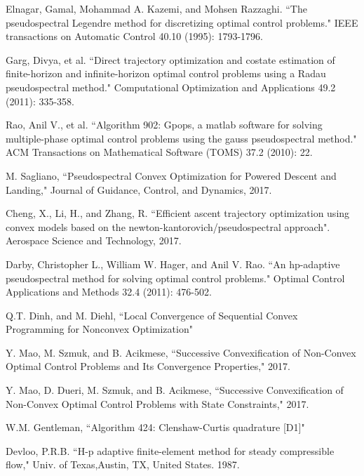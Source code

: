 \documentclass[10pt,a4paper]{article}
\begin{document}
\begin{thebibliography}{1}
		Elnagar, Gamal, Mohammad A. Kazemi, and Mohsen Razzaghi. ``The pseudospectral Legendre method for discretizing optimal control problems." IEEE transactions on Automatic Control 40.10 (1995): 1793-1796.
		
		Garg, Divya, et al. ``Direct trajectory optimization and costate estimation of finite-horizon and infinite-horizon optimal control problems using a Radau pseudospectral method." Computational Optimization and Applications 49.2 (2011): 335-358.
		
		Rao, Anil V., et al. ``Algorithm 902: Gpops, a matlab software for solving multiple-phase optimal control problems using the gauss pseudospectral method." ACM Transactions on Mathematical Software (TOMS) 37.2 (2010): 22.				
					
				
		M. Sagliano, ``Pseudospectral Convex Optimization for Powered Descent and Landing," Journal of Guidance, Control, and Dynamics, 2017.
		
		Cheng, X., Li, H., and Zhang, R. ``Efficient ascent trajectory optimization using convex models based on the newton-kantorovich/pseudospectral approach". Aerospace Science and Technology, 2017.
		
		Darby, Christopher L., William W. Hager, and Anil V. Rao. ``An hp-adaptive pseudospectral method for solving optimal control problems." Optimal Control Applications and Methods 32.4 (2011): 476-502.
		
		Q.T. Dinh, and M. Diehl, ``Local Convergence of Sequential Convex Programming for Nonconvex Optimization"
		
		Y. Mao, M. Szmuk, and B. Acikmese, ``Successive Convexification of Non-Convex Optimal Control Problems and Its Convergence Properties," 2017.
		
		Y. Mao, D. Dueri, M. Szmuk, and B. Acikmese, ``Successive Convexification of Non-Convex Optimal Control Problems with State Constraints," 2017.
		
		W.M. Gentleman, ``Algorithm 424: Clenshaw-Curtis quadrature [D1]"
		
		Devloo, P.R.B. ``H-p adaptive finite-element method for steady compressible flow," Univ. of Texas,Austin, TX, United States. 1987.
		
	\end{thebibliography}
\end{document}
